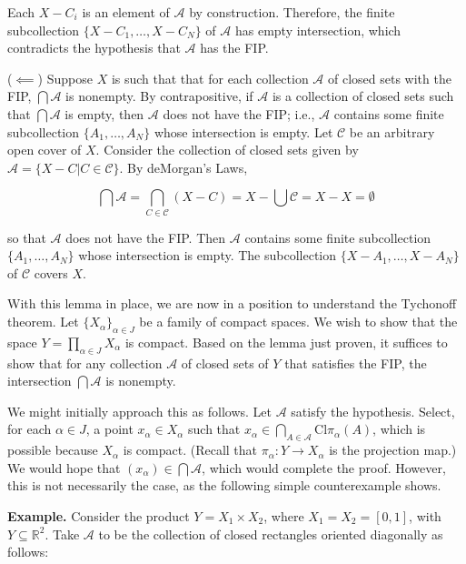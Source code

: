 \documentclass[12pt]{article}
\begin{document}
Each $X - C_i$ is an element of $\mathcal{A}$ by construction. Therefore, the finite subcollection $\{ X - C_1, \dots, X - C_N \}$ of $\mathcal{A}$ has empty intersection, which contradicts the hypothesis that $\mathcal{A}$ has the FIP.

($\impliedby$) Suppose $X$ is such that that for each collection $\mathcal{A}$ of closed sets with the FIP, $\bigcap \mathcal{A}$ is nonempty. By contrapositive, if $\mathcal{A}$ is a collection of closed sets such that $\bigcap \mathcal{A}$ is empty, then $\mathcal{A}$ does not have the FIP; i.e., $\mathcal{A}$ contains some finite subcollection $\{ A_1, \dots, A_N \}$ whose intersection is empty. Let $\mathcal{C}$ be an arbitrary open cover of $X$. Consider the collection of closed sets given by $\mathcal{A} = \{ X - C | C \in \mathcal{C} \}$. By deMorgan's Laws,

$$\bigcap \mathcal{A} = \bigcap_{C \in \mathcal{C}} (X - C) = X - \bigcup \mathcal{C} = X - X = \emptyset$$

so that $\mathcal{A}$ does not have the FIP. Then $\mathcal{A}$ contains some finite subcollection $\{ A_1, \dots, A_N \}$ whose intersection is empty. The subcollection $\{ X - A_1, \dots, X - A_N \}$ of $\mathcal{C}$ covers $X$.

\vspace{1 \baselineskip}

With this lemma in place, we are now in a position to understand the Tychonoff theorem. Let $\{ X_\alpha \}_{\alpha \in J}$ be a family of compact spaces. We wish to show that the space $Y = \prod_{\alpha \in J} X_\alpha$ is compact. Based on the lemma just proven, it suffices to show that for any collection $\mathcal{A}$ of closed sets of $Y$ that satisfies the FIP, the intersection $\bigcap \mathcal{A}$ is nonempty.

We might initially approach this as follows. Let $\mathcal{A}$ satisfy the hypothesis. Select, for each $\alpha \in J$, a point $x_\alpha \in X_\alpha$ such that $x_\alpha \in \bigcap_{A \in \mathcal{A}} \text{Cl} \pi_\alpha (A)$, which is possible because $X_\alpha$ is compact. (Recall that $\pi_\alpha: Y \to X_\alpha$ is the projection map.) We would hope that $(x_\alpha) \in \bigcap \mathcal{A}$, which would complete the proof. However, this is not necessarily the case, as the following simple counterexample shows.

\textbf{Example. } Consider the product $Y = X_1 \times X_2$, where $X_1 = X_2 = [0, 1]$, with $Y \subseteq \mathbb{R}^2$. Take $\mathcal{A}$ to be the collection of closed rectangles oriented diagonally as follows:
\end{document}
